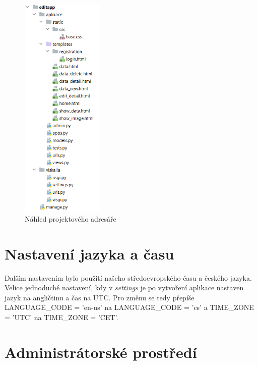 \begin{figure}[H] \centering
    \includegraphics[width=110pt]{./pictures/7-nahled-adresare.PNG}
    \caption[Náhled projektového adresáře]{Náhled projektového adresáře}
	\label{fig:Náhled projektového adresáře}              
\end{figure}

\section{Nastavení jazyka a času}

Dalším nastavením bylo použití našeho středoevropského času a českého
jazyka. Velice jednoduché nastavení, kdy v \emph{settings} je po
vytvoření aplikace nastaven jazyk na angličtinu a čas na UTC. Pro
změnu se tedy přepíše LANGUAGE\_CODE = 'en-us' na
LANGUAGE\_CODE = 'cs' a TIME\_ZONE = 'UTC' na
TIME\_ZONE = 'CET'.

\newpage

\section{Administrátorské prostředí}

